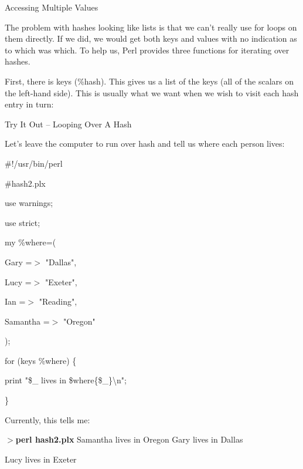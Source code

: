 \documentclass[a4paper,11pt]{book}
\begin{document}
\noindent Accessing Multiple Values

\noindent 

\noindent The problem with hashes looking like lists is that we can't really use for loops on them directly. If we did, we would get both keys and values with no indication as to which was which. To help us, Perl provides three functions for iterating over hashes.

\noindent 

\noindent First, there is keys (\%hash). This gives us a list of the keys (all of the scalars on the left-hand side). This is usually what we want when we wish to visit each hash entry in turn:

\noindent 

\noindent 

\noindent Try It Out -- Looping Over A Hash

\noindent 

\noindent 

\noindent Let's leave the computer to run over hash and tell us where each person lives:

\noindent 

\noindent 

\noindent \#!/usr/bin/perl

\noindent \#hash2.plx

\noindent use warnings;

\noindent use strict;

\noindent 

\noindent my \%where=(

\noindent Gary =$>$ "Dallas",

\noindent Lucy =$>$ "Exeter",

\noindent Ian =$>$ "Reading",

\noindent Samantha =$>$ "Oregon"

\noindent );

\noindent 

\noindent for (keys \%where) \{

\noindent print "\$\_  lives in \$where\{\$\_\}\textbackslash n";

\noindent \}

\noindent 

\noindent Currently, this tells me:

\noindent 

\noindent $>$\textbf{perl hash2.plx }Samantha lives in Oregon Gary lives in Dallas

\noindent Lucy lives in Exeter
\end{document}
